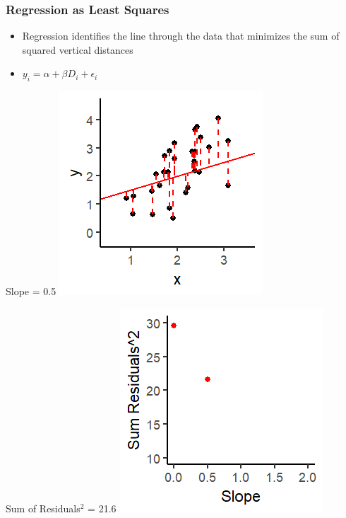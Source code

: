 \documentclass[xcolor=x11names,compress]{beamer}\usepackage[]{graphicx}\usepackage[]{color}
\makeatletter
\def\maxwidth{ %
  \ifdim\Gin@nat@width>\linewidth
    \linewidth
  \else
    \Gin@nat@width
  \fi
}
\newenvironment{knitrout}{}{} %
\renewcommand{\(}{\begin{columns}}
\renewcommand{\)}{\end{columns}}
\newcommand{\<}[1]{\begin{column}{#1}}
\renewcommand{\>}{\end{column}}
\makeatother
\begin{document}
\begin{frame}
\frametitle{Regression as Least Squares}
\begin{itemize}
\item Regression identifies the line through the data that minimizes the sum of squared vertical distances 
\item $y_i = \alpha + \beta D_i + \epsilon_i$
\end{itemize}
\begin{multicols}{2}
Slope = 0.5
\begin{knitrout}
\color{fgcolor}
\includegraphics[width=\maxwidth]{figure/graph_ols2-1} 

\end{knitrout}
\columnbreak
Sum of Residuals$^2$ = 21.6
\begin{knitrout}
\color{fgcolor}
\includegraphics[width=\maxwidth]{figure/graph_ssr2-1} 

\end{knitrout}
\end{multicols}
\end{frame}
\end{document}
